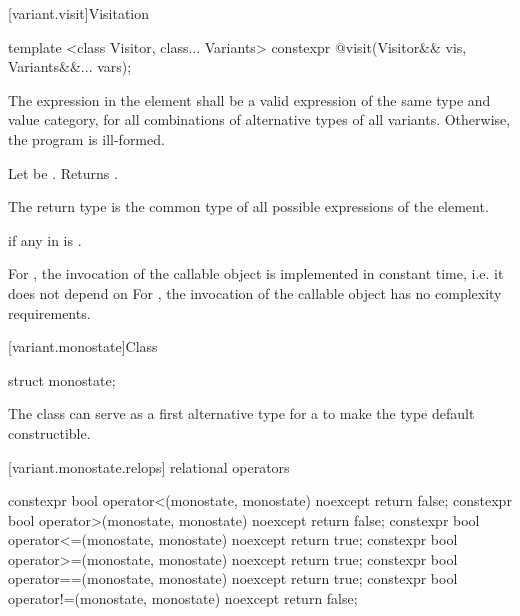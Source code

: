 [variant.visit]{Visitation}

%
%
\begin{itemdecl}
template <class Visitor, class... Variants>
  constexpr @\seebelow@ visit(Visitor&& vis, Variants&&... vars);
\end{itemdecl}

\begin{itemdescr}
\pnum
\requires
The expression in the \effects element shall be a valid expression of the same
 type and value category, for all combinations of alternative types of all
 variants. Otherwise, the program is ill-formed.

\effects
Let  be . Returns \brk{}
.

\pnum
\remarks
The return type is the common type of all possible 
expressions of the \effects element.

\pnum
\throws
{} if any  in  is .

\complexity
For , the invocation of the callable object is
implemented in constant time, i.e. it does not depend on 
For , the invocation of the callable object has
no complexity requirements.
\end{itemdescr}

%
[variant.monostate]{Class }

\begin{itemdecl}
struct monostate{};
\end{itemdecl}

\begin{itemdescr}
The class  can serve as a first alternative type for
a  to make the  type default constructible.
\end{itemdescr}


[variant.monostate.relops]{ relational operators}

%
%
%
%
%
%
\begin{itemdecl}
constexpr bool operator<(monostate, monostate) noexcept { return false; }
constexpr bool operator>(monostate, monostate) noexcept { return false; }
constexpr bool operator<=(monostate, monostate) noexcept { return true; }
constexpr bool operator>=(monostate, monostate) noexcept { return true; }
constexpr bool operator==(monostate, monostate) noexcept { return true; }
constexpr bool operator!=(monostate, monostate) noexcept { return false; }
\end{itemdecl}

